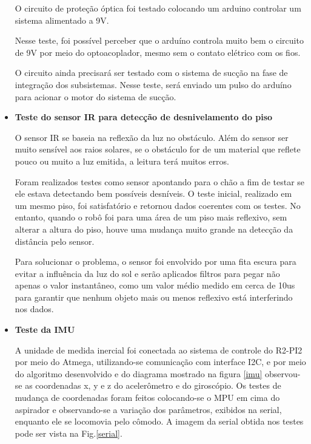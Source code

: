 \begin{itemize}
			O circuito de proteção óptica foi testado colocando um arduino controlar um sistema alimentado a 9V.

			Nesse teste, foi possível perceber que o arduíno controla muito bem o circuito de 9V por meio do optoacoplador, mesmo sem o contato elétrico com os fios.

			O circuito ainda precisará ser testado com o sistema de sucção na fase de integração dos subsistemas. Nesse teste, será enviado um pulso do arduíno para acionar o motor do sistema de sucção.

		\item \textbf{Teste do sensor IR para detecção de desnivelamento do piso}

			O sensor IR se baseia na reflexão da luz no obstáculo. Além do sensor ser muito sensível aos raios solares, se o obstáculo for de um material que reflete pouco ou muito a luz emitida, a leitura terá muitos erros.

			Foram realizados testes como sensor apontando para o chão a fim de testar se ele estava detectando bem possíveis desníveis. O teste inicial, realizado em um mesmo piso, foi satisfatório e retornou dados coerentes com os testes. No entanto, quando o robô foi para uma área de um piso mais reflexivo, sem alterar a altura do piso, houve uma mudança muito grande na detecção da distância pelo sensor. 

			Para solucionar o problema, o sensor foi envolvido por uma fita escura para evitar a influência da luz do sol e serão aplicados filtros para pegar não apenas o valor instantâneo, como um valor médio medido em cerca de 10us para garantir que nenhum objeto mais ou menos reflexivo está interferindo nos dados.

		\item \textbf{Teste da IMU}

			A unidade de medida inercial foi conectada ao sistema de controle do R2-PI2 por meio do Atmega, utilizando-se comunicação com  interface I2C, e por meio do algoritmo desenvolvido e do diagrama mostrado na figura \ref{imu}  observou-se as coordenadas x, y e z do acelerômetro e do giroscópio. Os testes de mudança de coordenadas foram feitos colocando-se o MPU em cima do aspirador e observando-se a variação dos parâmetros, exibidos na serial, enquanto ele se locomovia pelo cômodo. A imagem da serial obtida nos testes pode ser vista na Fig.\ref{serial}.


\end{itemize}
